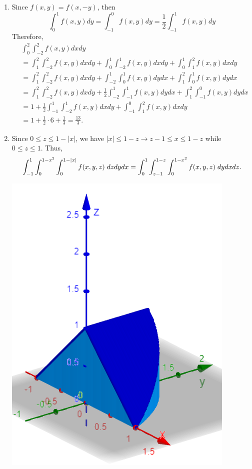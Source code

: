 \documentclass{article}
\begin{document}
\begin{enumerate}
    \newpage
    \item Since $f(x,y)=f(x,-y)$, then
    \[\int_0^1 f(x,y) dy = \int_{-1}^0 f(x,y) dy = \frac{1}{2} \int_{-1}^1 f(x,y) dy\]
    Therefore,
    \begin{align*}
        &\int_0^2 \int_{-2}^2 f(x,y) dxdy\\
        &= \int_1^2 \int_{-2}^2 f(x,y) dxdy + \int_0^1 \int_{-2}^1 f(x,y) dxdy + \int_0^1 \int_{1}^2 f(x,y) dxdy\\
        &= \int_1^2 \int_{-2}^2 f(x,y) dxdy + \int_{-2}^1 \int_0^1 f(x,y) dydx + \int_{1}^2 \int_0^1 f(x,y) dydx\\
        &= \int_1^2 \int_{-2}^2 f(x,y) dxdy + \frac{1}{2}\int_{-2}^1 \int_{-1}^1 f(x,y) dydx + \int_{1}^2 \int_{-1}^0 f(x,y) dydx\\
        &= 1 + \frac{1}{2}\int_{-1}^1 \int_{-2}^1 f(x,y) dxdy + \int_{-1}^0 \int_{1}^2 f(x,y) dxdy\\
        &= 1 + \frac{1}{2}\cdot 6 + \frac{1}{3} = \frac{13}{3}.
    \end{align*}
    
    
    \vspace{2cm}
    \item Since $0 \le z \le 1 - |x|$, we have $|x| \le 1 - z \rightarrow z - 1 \le x \le 1 - z$ while $0 \le z \le 1$. Thus,
    \[\int_{-1}^1\int_0^{1-x^2}\int_0^{1-|x|}f(x,y,z)\hspace{1mm}dzdydx = \int_{0}^1\int_{z-1}^{1-z}\int_0^{1-x^2}f(x,y,z)\hspace{1mm}dydxdz.\]
    \begin{center}
        \includegraphics[scale=0.75]{q5.png}
    \end{center}
    

\end{enumerate}
\end{document}
